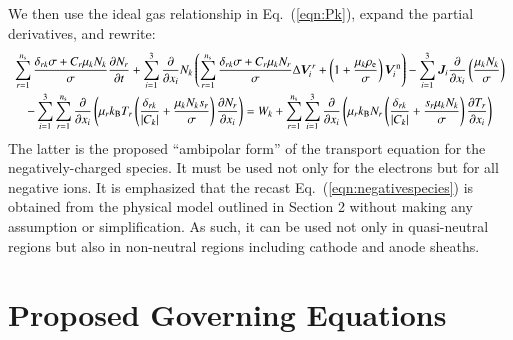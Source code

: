 \documentclass[twoside,onecolumn,10pt]{waflarticle}
\renewcommand{\vec}[1]{\bm{#1}}
\newcommand{\alb}{\vspace{0.1cm}\\} %
\newcommand{\mfd}{\displaystyle}
\newcommand{\ns}{{n_{\rm s}}}
\renewcommand{\vec}[1]{\bm{ #1 }}
\begin{document}
%
We then use the ideal gas relationship in Eq.\ (\ref{eqn:Pk}), expand the partial derivatives, and rewrite:
%
\begin{equation}
\begin{array}{l}\mfd
  \sum_{r=1}^{\ns} \frac{\delta_{rk}\sigma+C_r  \mu_k N_k}{\sigma} \frac{\partial N_r}{\partial t}  
+ \sum_{i=1}^3 \frac{\partial}{\partial x_i}   N_k \left(\sum_{r=1}^\ns \frac{\delta_{rk}\sigma+C_r  \mu_k N_r}{\sigma} \Delta \vec{V}_i^r +\left(1+\frac{\mu_k\rho_{\rm e}}{\sigma}\right)\vec{V}^{\rm n}_i\right) 
- \sum_{i=1}^3 \vec{J}_i \frac{\partial}{\partial x_i}  \left( \frac{\mu_k N_k}{\sigma} 
\right) 
\alb\mfd~~~~
- \sum_{i=1}^3 \sum_{r=1}^{\ns} \frac{\partial}{\partial x_i} \left(\mu_r k_{\rm B} T_r\left(\frac{ \delta_{rk} }{ |C_k|}+   \frac{ \mu_k N_k s_r}{\sigma}\right)  \frac{\partial N_r}{\partial x_i}\right) 
= W_k
+ \sum_{r=1}^\ns \sum_{i=1}^3  \frac{\partial}{\partial x_i} \left( \mu_r k_{\rm B} N_r   \left(\frac{\delta_{rk}}{|C_k|}+\frac{s_r \mu_k N_k}{\sigma}\right)  \frac{\partial T_r}{\partial x_i} \right)
\end{array}
\label{eqn:negativespecies}
\end{equation}
%
The latter is the proposed ``ambipolar form'' of the transport equation for the negatively-charged species. It must be used not only for the electrons but for all negative ions. It is emphasized that the recast Eq.\ (\ref{eqn:negativespecies}) is obtained from the physical model outlined in Section 2 without making any assumption or simplification. As such, it can be used not only in quasi-neutral regions but also in non-neutral regions including cathode and anode sheaths. 






\section{Proposed Governing Equations}
\end{document}
